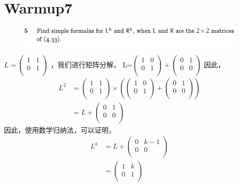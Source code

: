\documentclass[]{article}
\begin{document}
\section*{Warmup7}
\begin{figure}[H]
    \includegraphics[scale = 0.6]{2023-03-16-10-46-00.png}
\end{figure}
$
L=
\begin{pmatrix}
    1 & 1 \\
    0 & 1 \\
\end{pmatrix}$
，我们进行矩阵分解，
L=$
\begin{pmatrix}
    1 & 0 \\
    0 & 1 \\
\end{pmatrix}
+ 
\begin{pmatrix}
    0 & 1\\
    0 & 0\\
\end{pmatrix}$
因此，
\begin{align}
    L^2&=
    \begin{pmatrix}
        1 & 1 \\
        0 & 1 \\
    \end{pmatrix}
    \times
    \left(
    \begin{pmatrix}
        1 & 0 \\
        0 & 1 \\
    \end{pmatrix}
    + 
    \begin{pmatrix}
        0 & 1\\
        0 & 0\\
    \end{pmatrix}
    \right)
    \\
    &=L+\begin{pmatrix}
        0 & 1\\
        0 & 0\\
    \end{pmatrix}
\end{align}
因此，使用数学归纳法，可以证明，
\begin{align}
    L^k &= L + \begin{pmatrix}
        0 & k-1\\
        0 & 0\\
    \end{pmatrix}\\
    &=\begin{pmatrix}
        1 & k\\
        0 & 1\\
    \end{pmatrix}
\end{align}
\end{document}
